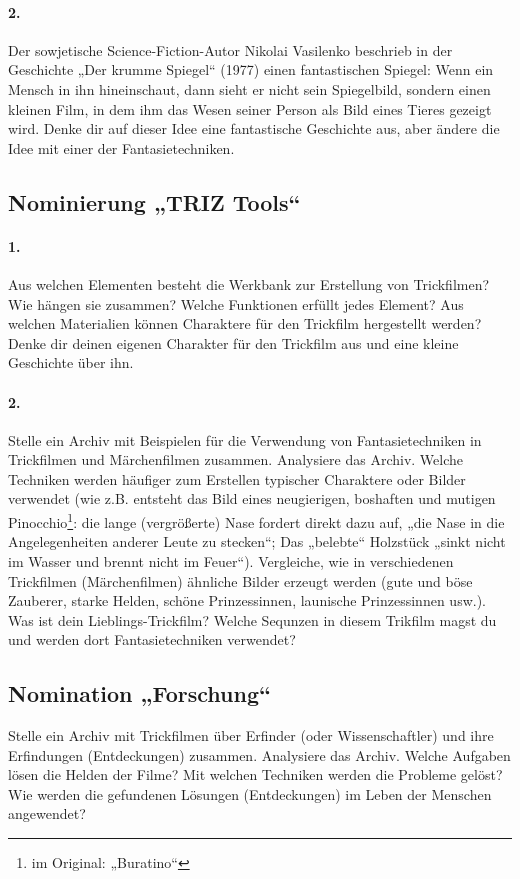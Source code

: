 \documentclass[11pt,a4paper]{article}
\begin{document}
\paragraph{2.}
Der sowjetische Science-Fiction-Autor Nikolai Vasilenko beschrieb in der
Geschichte „Der krumme Spiegel“ (1977) einen fantastischen Spiegel: Wenn ein
Mensch in ihn hineinschaut, dann sieht er nicht sein Spiegelbild, sondern
einen kleinen Film, in dem ihm das Wesen seiner Person als Bild eines Tieres
gezeigt wird. Denke dir auf dieser Idee eine fantastische Geschichte aus, aber
ändere die Idee mit einer der Fantasietechniken.

\subsection*{Nominierung „TRIZ Tools“}

\paragraph{1.}
Aus welchen Elementen besteht die Werkbank zur Erstellung von Trickfilmen? Wie
hängen sie zusammen?  Welche Funktionen erfüllt jedes Element?  Aus welchen
Materialien können Charaktere für den Trickfilm hergestellt werden?  Denke dir
deinen eigenen Charakter für den Trickfilm aus und eine kleine Geschichte über
ihn.

\paragraph{2.}
Stelle ein Archiv mit Beispielen für die Verwendung von Fantasietechniken in
Trickfilmen und Märchenfilmen zusammen. Analysiere das Archiv. Welche
Techniken werden häufiger zum Erstellen typischer Charaktere oder Bilder
verwendet (wie z.B. entsteht das Bild eines neugierigen, boshaften und mutigen
Pinocchio\footnote{im Original: „Buratino“}: die lange (vergrößerte) Nase
fordert direkt dazu auf, „die Nase in die Angelegenheiten anderer Leute zu
stecken“; Das „belebte“ Holzstück „sinkt nicht im Wasser und brennt nicht im
Feuer“). Vergleiche, wie in verschiedenen Trickfilmen (Märchenfilmen) ähnliche
Bilder erzeugt werden (gute und böse Zauberer, starke Helden, schöne
Prinzessinnen, launische Prinzessinnen usw.). Was ist dein
Lieblings-Trickfilm? Welche Sequnzen in diesem Trikfilm magst du und werden
dort Fantasietechniken verwendet?

\subsection*{Nomination „Forschung“}
Stelle ein Archiv mit Trickfilmen über Erfinder (oder Wissenschaftler) und
ihre Erfindungen (Entdeckungen) zusammen. Analysiere das Archiv. Welche
Aufgaben lösen die Helden der Filme?  Mit welchen Techniken werden die
Probleme gelöst? Wie werden die gefundenen Lösungen (Entdeckungen) im Leben
der Menschen angewendet?
\end{document}
